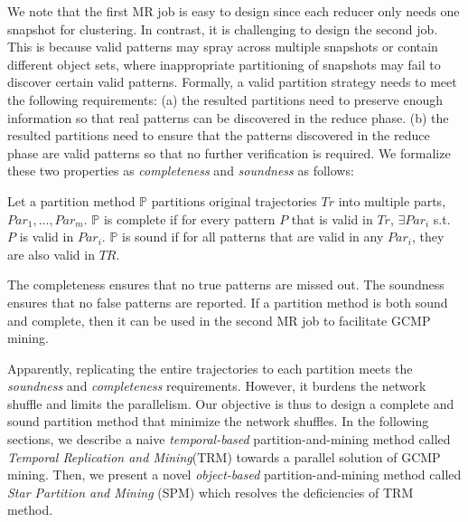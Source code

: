 We note that the first MR job is easy to design since each reducer only
needs one snapshot for clustering.
In contrast, it is challenging to design the second job. 
This is because valid patterns may spray across multiple snapshots or contain different object sets, where inappropriate partitioning
of snapshots may fail to discover certain valid patterns.
Formally, a valid partition strategy 
needs to meet the following requirements: (a) the resulted partitions need
to preserve enough information so that real patterns can be discovered in the reduce phase. 
(b) the resulted partitions need to ensure that
the patterns discovered in the reduce phase are valid patterns so that
no further verification is required. We formalize these two 
properties as \emph{completeness} and \emph{soundness} as follows:

\begin{definition}
Let a partition method $\mathbb{P}$ partitions original trajectories $Tr$ into multiple parts, $Par_1,...,Par_m$. $\mathbb{P}$ is complete if for every pattern $P$ that is valid in $Tr$, $\exists Par_i$ s.t. $P$ is valid in $Par_i$. $\mathbb{P}$ is sound if for all patterns that are valid in any $Par_i$, they are also valid in $TR$.
\end{definition}
The completeness ensures that no true patterns are missed out. 
The soundness ensures that no false patterns are reported. 
If a partition method is both sound and complete, then it can be used
in the second MR job to facilitate GCMP mining.

Apparently, replicating the entire trajectories to each 
partition meets the \emph{soundness} and \emph{completeness} requirements. 
However, it burdens the network shuffle and limits the parallelism. 
Our objective is thus to design a complete and sound partition method that minimize the network shuffles.
In the following sections, we describe a naive \emph{temporal-based} partition-and-mining method called \emph{Temporal Replication and Mining}(TRM) towards a parallel solution of GCMP mining. Then,
we present a novel \emph{object-based} partition-and-mining method
called \emph{Star Partition and Mining} (SPM) which resolves
the deficiencies of TRM method.



%

